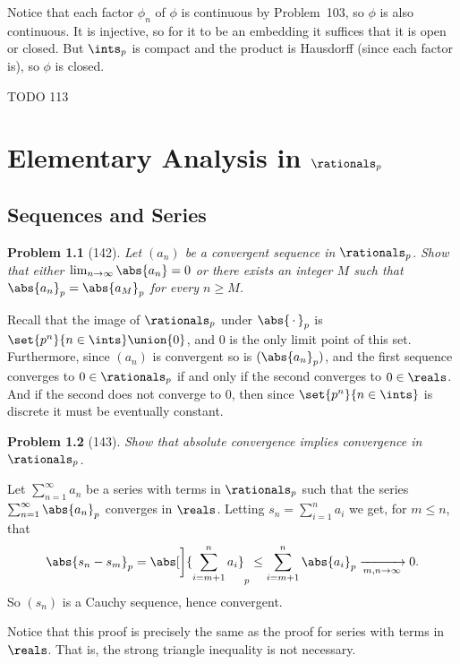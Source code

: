 \documentclass[a4paper, 11pt]{memoir}
\theoremstyle{plaincustomnumber}
\newtheorem{problem}{Problem}
\theoremstyle{changedotbreakcustomnumber}
\begin{document}
\begin{solution}
    Notice that each factor $\phi_n$ of $\phi$ is continuous by Problem~103, so $\phi$ is also continuous. It is injective, so for it to be an embedding it suffices that it is open or closed. But $\ints_p$ is compact and the product is Hausdorff (since each factor is), so $\phi$ is closed.
\end{solution}

TODO 113


\chapter{Elementary Analysis in $\rationals_p$}

\section{Sequences and Series}

\begin{problem}[142]
    Let $(a_n)$ be a convergent sequence in $\rationals_p$. Show that either $\lim_{n \to \infty} \abs{a_n} = 0$ or there exists an integer $M$ such that $\abs{a_n}_p = \abs{a_M}_p$ for every $n \geq M$.
\end{problem}

\begin{solution}
    Recall that the image of $\rationals_p$ under $\abs{\,\cdot\,}_p$ is $\set{p^n}{n \in \ints} \union \{0\}$, and $0$ is the only limit point of this set. Furthermore, since $(a_n)$ is convergent so is $(\abs{a_n}_p)$, and the first sequence converges to $0 \in \rationals_p$ if and only if the second converges to $0 \in \reals$. And if the second does not converge to $0$, then since $\set{p^n}{n \in \ints}$ is discrete it must be eventually constant.
\end{solution}


\begin{problem}[143]
    Show that absolute convergence implies convergence in $\rationals_p$.
\end{problem}

\begin{solution}
    Let $\sum_{n=1}^\infty a_n$ be a series with terms in $\rationals_p$ such that the series $\sum_{n=1}^\infty \abs{a_n}_p$ converges in $\reals$. Letting $s_n = \sum_{i=1}^n a_i$ we get, for $m \leq n$, that
    \begin{equation*}
        \abs{s_n - s_m}_p
            = \abs[\bigg]{ \sum_{i=m+1}^n a_i }_p
            \leq \sum_{i=m+1}^n \abs{a_i}_p
            \xrightarrow[m,n \to \infty]{} 0.
    \end{equation*}
    So $(s_n)$ is a Cauchy sequence, hence convergent.

    Notice that this proof is precisely the same as the proof for series with terms in $\reals$. That is, the strong triangle inequality is not necessary.
\end{solution}
\end{document}
